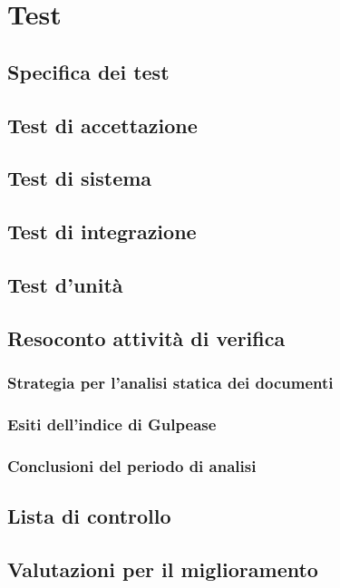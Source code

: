 \section{Test}

\subsection{Specifica dei test}

\subsection{Test di accettazione}

\subsection{Test di sistema}

\subsection{Test di integrazione}

\subsection{Test d'unità}

\subsection{Resoconto attività di verifica}
\subsubsection{Strategia per l'analisi statica dei documenti}
\subsubsection{Esiti dell'indice di Gulpease}
\subsubsection{Conclusioni del periodo di analisi}

\subsection{Lista di controllo}

\subsection{Valutazioni per il miglioramento}

